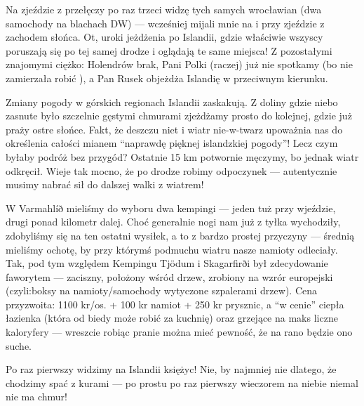 Na zjeździe z przełęczy po raz trzeci widzę tych samych wrocławian (dwa samochody na blachach DW) --- wcześniej mijali mnie na  i przy zjeździe z zachodem słońca. Ot, uroki jeżdżenia po Islandii, gdzie właściwie wszyscy poruszają się po tej samej drodze i oglądają te same miejsca! Z pozostałymi znajomymi ciężko: Holendrów brak, Pani Polki (raczej) już nie spotkamy (bo nie zamierzała robić ), a Pan Rusek objeżdża Islandię w przeciwnym kierunku.

Zmiany pogody w górskich regionach Islandii zaskakują. Z doliny gdzie niebo zasnute było szczelnie gęstymi chmurami zjeżdżamy prosto do kolejnej, gdzie już praży ostre słońce. Fakt, że deszczu niet i wiatr nie-w-twarz upoważnia nas do określenia całości mianem “naprawdę pięknej islandzkiej pogody”! Lecz czym byłaby podróż bez przygód? Ostatnie 15 km potwornie męczymy, bo jednak wiatr odkręcił. Wieje tak mocno, że po drodze robimy odpoczynek --- autentycznie musimy nabrać sił do dalszej walki z wiatrem!

W Varmahlíð mieliśmy do wyboru dwa kempingi --- jeden tuż przy wjeździe, drugi ponad kilometr dalej. Choć generalnie nogi nam już z tyłka wychodziły, zdobyliśmy się na ten ostatni wysiłek, a to z bardzo prostej przyczyny --- średnią mieliśmy ochotę, by przy którymś podmuchu wiatru nasze namioty odleciały. Tak, pod tym względem Kempingu Tjödum i Skagarfirði był zdecydowanie faworytem --- zaciszny, położony wśród drzew, zrobiony na wzrór europejski (czyli:boksy na namioty/samochody wytyczone szpalerami drzew). Cena przyzwoita: 1100 kr/os. + 100 kr namiot + 250 kr prysznic, a “w cenie” ciepła łazienka (która od biedy może robić za kuchnię) oraz grzejące na maks liczne kaloryfery --- wreszcie robiąc pranie można mieć pewność, że na rano będzie ono suche.

Po raz pierwszy widzimy na Islandii księżyc! Nie, by najmniej nie dlatego, że chodzimy spać z kurami --- po prostu po raz pierwszy wieczorem na niebie niemal nie ma chmur!
